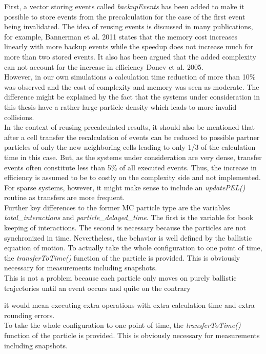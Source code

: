 First, a vector storing events called \textit{backupEvents} has been added to make it possible to store events from the precalculation for the case of the first event being invalidated. The idea of reusing events is discussed in many publications, for example, Bannerman et al. 2011\cite{Bannerman2011} states that the memory cost increases linearly with more backup events while the speedup does not increase much for more than two stored events. It also has been argued that the added complexity can not account for the increase in efficiency Donev et al. 2005\cite{DONEV2005}.\\ 
However, in our own simulations a calculation time reduction of more than 10\% was observed and the cost of complexity and memory was seen as moderate. The difference might be explained by the fact that the systems under consideration in this thesis have a rather large particle density which leads to more invalid collisions.\\

In the context of reusing precalculated results, it should also be mentioned that after a cell transfer the recalculation of events can be reduced to possible partner particles of only the new neighboring cells leading to only 1/3 of the calculation time in this case. But, as the systems under consideration are very dense, transfer events often constitute less than 5\% of all executed events. Thus, the increase in efficiency is assumed to be to costly on the complexity side and not implemented. For sparse systems, however, it might make sense to include an \textit{updatePEL()} routine as transfers are more frequent.\\

Further key differences to the former MC particle type are the variables \textit{total\_interactions} and \textit{particle\_delayed\_time}. The first is the variable for book keeping of interactions. The second is necessary because the particles are not synchronized in time. Nevertheless, the behavior is well defined by the ballistic equation of motion. To actually take the whole configuration to one point of time, the \textit{transferToTime()} function of the particle is provided. This is obviously necessary for measurements including snapshots.\\

This is not a problem because each particle only moves on purely ballistic trajectories until an event occurs and quite on the contrary 

it would mean executing extra operations with extra calculation time and extra rounding errors.\\
To take the whole configuration to one point of time, the \textit{transferToTime()} function of the particle is provided. This is obviously necessary for measurements including snapshots.\\

